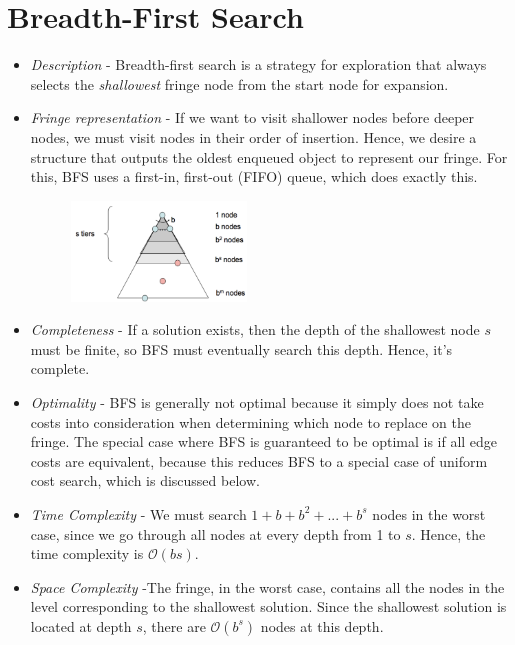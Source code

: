\documentclass{article}[letterpaper]
\begin{document}
\section*{Breadth-First Search}
\begin{itemize}
\item \textit{Description} - Breadth-first search is a strategy for exploration that always selects the \textit{shallowest}
 fringe node from the start node for expansion.


\item \textit{Fringe representation} - If we want to visit shallower nodes before deeper nodes, we must visit nodes in their order of insertion. Hence, we desire a structure that outputs the oldest enqueued object to represent our fringe. For this, BFS uses a first-in, first-out (FIFO) queue, which does exactly this.

\begin{figure}
\centering
\includegraphics[width=0.44\textwidth]{figs/BFS} 
\end{figure}

\item \textit{Completeness} - If a solution exists, then the depth of the shallowest node $s$ must be finite, so BFS must eventually search this depth. Hence, it’s complete.

\item \textit{Optimality} -  BFS is generally not optimal because it simply does not take costs into consideration when determining which node to replace on the fringe. The special case where BFS is guaranteed to be optimal is if all edge costs are equivalent, because this reduces BFS to a special case of uniform cost search, which is discussed below.

\item \textit{Time Complexity} - We must search $1+b+b^2+...+b^s$ nodes in the worst case, since we go through all nodes at every depth from 1 to $s$. Hence, the time complexity is $\mathcal{O}(bs)$.

\item \textit{Space Complexity} -The fringe, in the worst case, contains all the nodes in the level corresponding to the shallowest solution. Since the shallowest solution is located at depth $s$, there are $\mathcal{O}(b^s)$ nodes at this depth.
\end{itemize}
\end{document}
